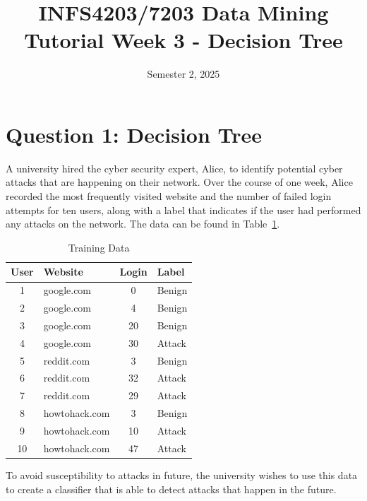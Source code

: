 \documentclass[12pt,a4paper]{article}
\title{INFS4203/7203 Data Mining \\ Tutorial Week 3 - Decision Tree}
\author{Semester 2, 2025}
\date{}
\begin{document}
\maketitle

\section*{Question 1: Decision Tree}

A university hired the cyber security expert, Alice, to identify potential cyber attacks that are happening on their network. Over the course of one week, Alice recorded the most frequently visited website and the number of failed login attempts for ten users, along with a label that indicates if the user had performed any attacks on the network. The data can be found in Table~\ref{tab:train}.

\begin{table}[h!]
  \centering
  \caption{Training Data}
  \label{tab:train}
  \begin{tabular}{c l c l}
    \toprule
    \textbf{User} & \textbf{Website} & \textbf{Login} & \textbf{Label} \\
    \midrule
    1             & google.com       & 0              & Benign         \\
    2             & google.com       & 4              & Benign         \\
    3             & google.com       & 20             & Benign         \\
    4             & google.com       & 30             & Attack         \\
    5             & reddit.com       & 3              & Benign         \\
    6             & reddit.com       & 32             & Attack         \\
    7             & reddit.com       & 29             & Attack         \\
    8             & howtohack.com    & 3              & Benign         \\
    9             & howtohack.com    & 10             & Attack         \\
    10            & howtohack.com    & 47             & Attack         \\
    \bottomrule
  \end{tabular}
\end{table}

To avoid susceptibility to attacks in future, the university wishes to use this data to create a classifier that is able to detect attacks that happen in the future.
\end{document}
